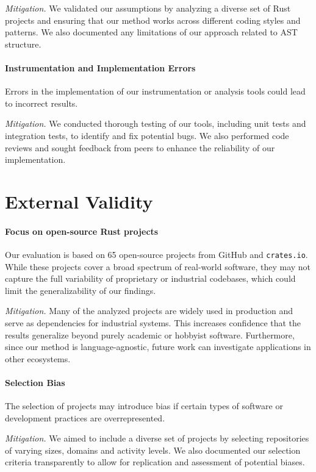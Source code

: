 \textit{Mitigation.}
We validated our assumptions by analyzing a diverse set of Rust projects and ensuring that our method works across different coding styles and patterns.
We also documented any limitations of our approach related to AST structure.

\paragraph{Instrumentation and Implementation Errors}
Errors in the implementation of our instrumentation or analysis tools could lead to incorrect results.

\textit{Mitigation.}
We conducted thorough testing of our tools, including unit tests and integration tests, to identify and fix potential bugs.
We also performed code reviews and sought feedback from peers to enhance the reliability of our implementation.


\section{External Validity}\label{sec:external-validity}
\paragraph{Focus on open-source Rust projects}
Our evaluation is based on 65 open-source projects from GitHub and \texttt{crates.io}.
While these projects cover a broad spectrum of real-world software, they may not capture the full variability of proprietary or industrial codebases, which could limit the generalizability of our findings.

\textit{Mitigation.}
Many of the analyzed projects are widely used in production and serve as dependencies for industrial systems.
This increases confidence that the results generalize beyond purely academic or hobbyist software.
Furthermore, since our method is language-agnostic, future work can investigate applications in other ecosystems.

\paragraph{Selection Bias}
The selection of projects may introduce bias if certain types of software or development practices are overrepresented.

\textit{Mitigation.}
We aimed to include a diverse set of projects by selecting repositories of varying sizes, domains and activity levels.
We also documented our selection criteria transparently to allow for replication and assessment of potential biases.

